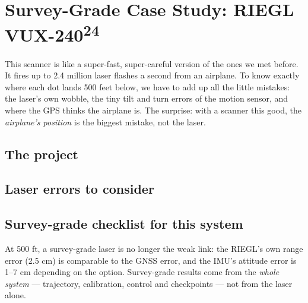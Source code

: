 \chapter{Survey-Grade Case Study: RIEGL VUX-240\textsuperscript{24}}

\begin{kid}
This scanner is like a super-fast, super-careful version of the ones we met before. It fires up to 2.4 million laser flashes a second from an airplane. To know exactly where each dot lands 500 feet below, we have to add up all the little mistakes: the laser's own wobble, the tiny tilt and turn errors of the motion sensor, and where the GPS thinks the airplane is. The surprise: with a scanner this good, the \emph{airplane's position} is the biggest mistake, not the laser.
\end{kid}

\section{The project}


\section{Laser errors to consider}


\section{Survey-grade checklist for this system}

\begin{bigidea}
At 500 ft, a survey-grade laser is no longer the weak link: the RIEGL's own range error (2.5 cm) is comparable to the GNSS error, and the IMU's attitude error is 1--7 cm depending on the option. Survey-grade results come from the \emph{whole system} --- trajectory, calibration, control and checkpoints --- not from the laser alone.
\end{bigidea}

